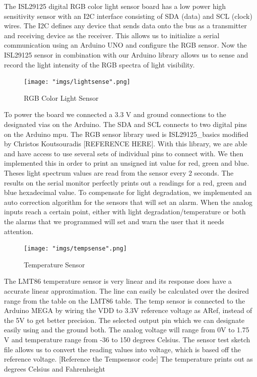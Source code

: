 \documentclass[12pt,a4paper]{report}
\begin{document}
The ISL29125 digital RGB color light sensor board has a low power high sensitivity sensor with an I2C interface consisting of SDA (data) and SCL (clock) wires. The I2C defines any device that sends data onto the bus as a transmitter and receiving device as the receiver. This allows us to initialize a serial communication using an Arduino UNO and configure the RGB sensor. Now the ISL29125 sensor in combination with our Arduino library allows us to sense and record the light intensity of the RGB spectra of light visibility.\\ \linebreak
\begin{figure}[H]
	\centering
	\texttt{[image: "imgs/lightsense".png]}\par			
	\vspace{0.1cm}
	\caption{RGB Color Light Sensor}
\end{figure} 
To power the board we connected a 3.3 V and ground connections to the designated vias on the Arduino. The SDA and SCL connects to two digital pins on the Arduino mpu. The RGB sensor library used is ISL29125\_basics modified by Christos Koutsouradis [REFERENCE HERE]. With this library, we are able and have access to use several sets of individual pins to connect with. We then implemented this in order to print an unsigned int value for red, green and blue. Theses light spectrum values are read from the sensor every 2 seconds. The results on the serial monitor perfectly prints out a readings for a red, green and blue hexadecimal value. To compensate for light degradation, we implemented an auto correction algorithm for the sensors that will set an alarm. When the analog inputs reach a certain point, either with light degradation/temperature or both the alarms that we programmed will set and warn the user that it needs attention.  \\ \linebreak

\begin{figure}[H]
	\centering
	\texttt{[image: "imgs/tempsense".png]}\par			
	\vspace{0.1cm}
	\caption{Temperature Sensor}
\end{figure}

The LMT86 temperature sensor is very linear and its response does have a accurate linear approximation. The line can easily be calculated over the desired range from the table on the LMT86 table. The temp sensor is connected to the Arduino MEGA by wiring the VDD to 3.3V reference voltage as ARef, instead of the 5V to get better precision. The selected output pin which we can designate easily using and the ground both. The analog voltage will range from 0V to 1.75 V and temperature range from -36 to 150 degrees Celsius. The sensor test sketch file allows us to convert the reading values into voltage, which is based off the reference voltage. [Reference the Tempsensor code] The temperature prints out as degrees Celsius and Fahrenheight
\end{document}
